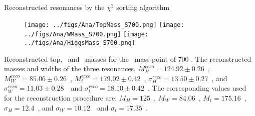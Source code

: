 \begin{frame}{Reconstructed resonances by the $\chi^{2}$ sorting algorithm}
\vspace{-.2cm}

\begin{figure}[!Hhtbp]
  \begin{center}
    \texttt{[image: ../figs/Ana/TopMass\_S700.png]}
    \texttt{[image: ../figs/Ana/WMass\_S700.png]}
    \texttt{[image: ../figs/Ana/HiggsMass\_S700.png]}
  \end{center}
\end{figure}

\vspace{-.2cm}
    \begin{block}{}
      \tiny \centering Reconstructed top, \W~and \Hb~masses for the \Tp~mass point of 700 \GeVcc. The reconstructed masses and widths of the three resonances, $M^{reco}_{H}=124.92\pm0.26$~\GeVcc, $M^{reco}_{W}=85.06\pm0.26$~\GeVcc, $M^{reco}_{t}=179.02\pm0.42$~\GeVcc, $\sigma^{reco}_{H}=13.50\pm0.27$~\GeVcc, and $\sigma^{reco}_{W}=11.03\pm0.28$~\GeVcc~and $\sigma^{reco}_{t}=18.10\pm0.42$~\GeVcc. The corresponding values used for the reconstruction procedure are: $M_{H}=125$~\GeVcc, $M_{W}=84.06$~\GeVcc, $M_{t}=175.16$~\GeVcc, $\sigma_{H}=12.4$~\GeVcc, and $\sigma_{W}=10.12$~\GeVcc~and $\sigma_{t}=17.35$~\GeVcc.
    \end{block}

\end{frame}

